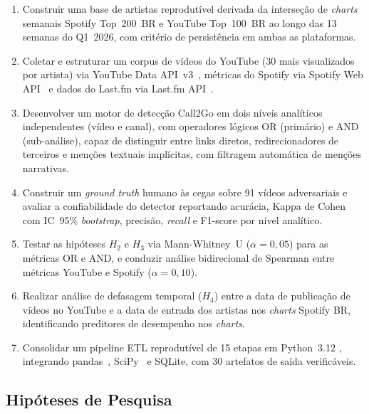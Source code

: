 ﻿\documentclass[12pt]{article}
\begin{document}
\begin{enumerate}
  \item Construir uma base de artistas reprodutível derivada da interseção de
    \textit{charts} semanais Spotify Top~200~BR e YouTube Top~100~BR ao longo
    das 13 semanas do Q1~2026, com critério de persistência em ambas as
    plataformas.

  \item Coletar e estruturar um corpus de vídeos do YouTube (30 mais
    visualizados por artista) via YouTube Data API~v3~\cite{youtubeapi2024},
    métricas do Spotify via Spotify Web API~\cite{spotifyapi2024} e dados do
    Last.fm via Last.fm API~\cite{lastfmapi2024}.

  \item Desenvolver um motor de detecção Call2Go em dois níveis analíticos
    independentes (vídeo e canal), com operadores lógicos OR (primário) e AND
    (sub-análise), capaz de distinguir entre links diretos, redirecionadores de
    terceiros e menções textuais implícitas, com filtragem automática de
    menções narrativas.

  \item Construir um \textit{ground truth} humano às cegas sobre 91 vídeos
    adversariais e avaliar a confiabilidade do detector reportando acurácia,
    Kappa de Cohen com IC~95\% \textit{bootstrap}, precisão, \textit{recall}
    e F1-score por nível analítico.

  \item Testar as hipóteses $H_2$ e $H_3$ via Mann-Whitney~U ($\alpha = 0{,}05$)
    para as métricas OR e AND, e conduzir análise bidirecional de Spearman
    entre métricas YouTube e Spotify ($\alpha = 0{,}10$).

  \item Realizar análise de defasagem temporal ($H_4$) entre a data de
    publicação de vídeos no YouTube e a data de entrada dos artistas nos
    \textit{charts} Spotify BR, identificando preditores de desempenho nos
    \textit{charts}.

  \item Consolidar um pipeline ETL reprodutível de 15 etapas em Python~3.12
    \cite{python2024}, integrando pandas~\cite{mckinney2010},
    SciPy~\cite{virtanen2020} e SQLite, com 30 artefatos de saída
    verificáveis.
\end{enumerate}

\subsection{Hipóteses de Pesquisa}
\end{document}
